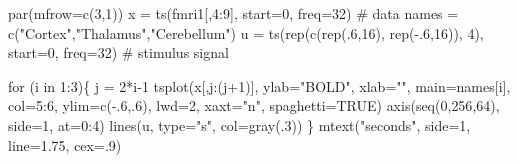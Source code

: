\documentclass[
  letterpaper,
  DIV=11,
  numbers=noendperiod]{scrreprt}
\newenvironment{Shaded}{\begin{snugshade}}{\end{snugshade}}
\newcommand{\AttributeTok}[1]{\textcolor[rgb]{0.40,0.45,0.13}{#1}}
\newcommand{\CommentTok}[1]{\textcolor[rgb]{0.37,0.37,0.37}{#1}}
\newcommand{\ConstantTok}[1]{\textcolor[rgb]{0.56,0.35,0.01}{#1}}
\newcommand{\ControlFlowTok}[1]{\textcolor[rgb]{0.00,0.23,0.31}{#1}}
\newcommand{\DecValTok}[1]{\textcolor[rgb]{0.68,0.00,0.00}{#1}}
\newcommand{\FloatTok}[1]{\textcolor[rgb]{0.68,0.00,0.00}{#1}}
\newcommand{\FunctionTok}[1]{\textcolor[rgb]{0.28,0.35,0.67}{#1}}
\newcommand{\NormalTok}[1]{\textcolor[rgb]{0.00,0.23,0.31}{#1}}
\newcommand{\OtherTok}[1]{\textcolor[rgb]{0.00,0.23,0.31}{#1}}
\newcommand{\SpecialCharTok}[1]{\textcolor[rgb]{0.37,0.37,0.37}{#1}}
\newcommand{\StringTok}[1]{\textcolor[rgb]{0.13,0.47,0.30}{#1}}
\begin{document}
\begin{Shaded}
\begin{Highlighting}[]
\FunctionTok{par}\NormalTok{(}\AttributeTok{mfrow=}\FunctionTok{c}\NormalTok{(}\DecValTok{3}\NormalTok{,}\DecValTok{1}\NormalTok{))}
\NormalTok{x }\OtherTok{=} \FunctionTok{ts}\NormalTok{(fmri1[,}\DecValTok{4}\SpecialCharTok{:}\DecValTok{9}\NormalTok{], }\AttributeTok{start=}\DecValTok{0}\NormalTok{, }\AttributeTok{freq=}\DecValTok{32}\NormalTok{)        }\CommentTok{\# data}
\NormalTok{names }\OtherTok{=} \FunctionTok{c}\NormalTok{(}\StringTok{"Cortex"}\NormalTok{,}\StringTok{"Thalamus"}\NormalTok{,}\StringTok{"Cerebellum"}\NormalTok{)}
\NormalTok{u }\OtherTok{=} \FunctionTok{ts}\NormalTok{(}\FunctionTok{rep}\NormalTok{(}\FunctionTok{c}\NormalTok{(}\FunctionTok{rep}\NormalTok{(.}\DecValTok{6}\NormalTok{,}\DecValTok{16}\NormalTok{), }\FunctionTok{rep}\NormalTok{(}\SpecialCharTok{{-}}\NormalTok{.}\DecValTok{6}\NormalTok{,}\DecValTok{16}\NormalTok{)), }\DecValTok{4}\NormalTok{), }\AttributeTok{start=}\DecValTok{0}\NormalTok{, }\AttributeTok{freq=}\DecValTok{32}\NormalTok{) }\CommentTok{\# stimulus signal}

\ControlFlowTok{for}\NormalTok{ (i }\ControlFlowTok{in} \DecValTok{1}\SpecialCharTok{:}\DecValTok{3}\NormalTok{)\{ }
\NormalTok{ j }\OtherTok{=} \DecValTok{2}\SpecialCharTok{*}\NormalTok{i}\DecValTok{{-}1}
 \FunctionTok{tsplot}\NormalTok{(x[,j}\SpecialCharTok{:}\NormalTok{(j}\SpecialCharTok{+}\DecValTok{1}\NormalTok{)], }\AttributeTok{ylab=}\StringTok{"BOLD"}\NormalTok{, }\AttributeTok{xlab=}\StringTok{""}\NormalTok{, }\AttributeTok{main=}\NormalTok{names[i], }\AttributeTok{col=}\DecValTok{5}\SpecialCharTok{:}\DecValTok{6}\NormalTok{, }\AttributeTok{ylim=}\FunctionTok{c}\NormalTok{(}\SpecialCharTok{{-}}\NormalTok{.}\DecValTok{6}\NormalTok{,.}\DecValTok{6}\NormalTok{), }
        \AttributeTok{lwd=}\DecValTok{2}\NormalTok{, }\AttributeTok{xaxt=}\StringTok{"n"}\NormalTok{, }\AttributeTok{spaghetti=}\ConstantTok{TRUE}\NormalTok{)}
 \FunctionTok{axis}\NormalTok{(}\FunctionTok{seq}\NormalTok{(}\DecValTok{0}\NormalTok{,}\DecValTok{256}\NormalTok{,}\DecValTok{64}\NormalTok{), }\AttributeTok{side=}\DecValTok{1}\NormalTok{, }\AttributeTok{at=}\DecValTok{0}\SpecialCharTok{:}\DecValTok{4}\NormalTok{)}
 \FunctionTok{lines}\NormalTok{(u, }\AttributeTok{type=}\StringTok{"s"}\NormalTok{, }\AttributeTok{col=}\FunctionTok{gray}\NormalTok{(.}\DecValTok{3}\NormalTok{)) }
\NormalTok{\}}
\FunctionTok{mtext}\NormalTok{(}\StringTok{"seconds"}\NormalTok{, }\AttributeTok{side=}\DecValTok{1}\NormalTok{, }\AttributeTok{line=}\FloatTok{1.75}\NormalTok{, }\AttributeTok{cex=}\NormalTok{.}\DecValTok{9}\NormalTok{)}
\end{Highlighting}
\end{Shaded}
\end{document}

